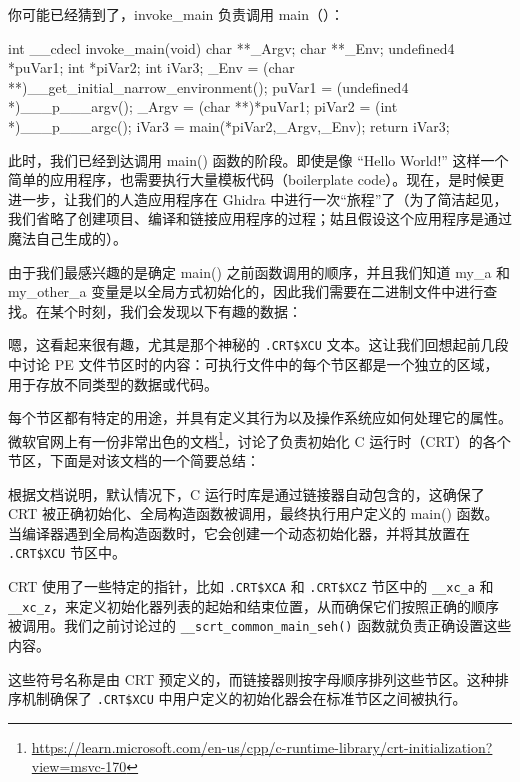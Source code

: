 
你可能已经猜到了，invoke\_main 负责调用 main（）：

\begin{cpp}
int __cdecl invoke_main(void) {
  char **_Argv;
  char **_Env;
  undefined4 *puVar1;
  int *piVar2;
  int iVar3;
  _Env = (char **)__get_initial_narrow_environment();
  puVar1 = (undefined4 *)___p___argv();
  _Argv = (char **)*puVar1;
  piVar2 = (int *)___p___argc();
  iVar3 = main(*piVar2,_Argv,_Env);
  return iVar3;
}
\end{cpp}

此时，我们已经到达调用 main() 函数的阶段。即使是像 “Hello World!” 这样一个简单的应用程序，也需要执行大量模板代码（boilerplate code）。现在，是时候更进一步，让我们的人造应用程序在 Ghidra 中进行一次“旅程”了（为了简洁起见，我们省略了创建项目、编译和链接应用程序的过程；姑且假设这个应用程序是通过魔法自己生成的）。

由于我们最感兴趣的是确定 main() 之前函数调用的顺序，并且我们知道 my\_a 和 my\_other\_a 变量是以全局方式初始化的，因此我们需要在二进制文件中进行查找。在某个时刻，我们会发现以下有趣的数据：


嗯，这看起来很有趣，尤其是那个神秘的 \verb|.CRT$XCU| 文本。这让我们回想起前几段中讨论 PE 文件节区时的内容：可执行文件中的每个节区都是一个独立的区域，用于存放不同类型的数据或代码。

每个节区都有特定的用途，并具有定义其行为以及操作系统应如何处理它的属性。微软官网上有一份非常出色的文档\footnote{\url{https://learn.microsoft.com/en-us/cpp/c-runtime-library/crt-initialization?view=msvc-170}}，讨论了负责初始化 C 运行时（CRT）的各个节区，下面是对该文档的一个简要总结：

根据文档说明，默认情况下，C 运行时库是通过链接器自动包含的，这确保了 CRT 被正确初始化、全局构造函数被调用，最终执行用户定义的 main() 函数。当编译器遇到全局构造函数时，它会创建一个动态初始化器，并将其放置在 \verb|.CRT$XCU| 节区中。

CRT 使用了一些特定的指针，比如 \verb|.CRT$XCA| 和 \verb|.CRT$XCZ| 节区中的 \verb|__xc_a| 和 \verb|__xc_z|，来定义初始化器列表的起始和结束位置，从而确保它们按照正确的顺序被调用。我们之前讨论过的 \verb|__scrt_common_main_seh()| 函数就负责正确设置这些内容。

这些符号名称是由 CRT 预定义的，而链接器则按字母顺序排列这些节区。这种排序机制确保了 \verb|.CRT$XCU| 中用户定义的初始化器会在标准节区之间被执行。

